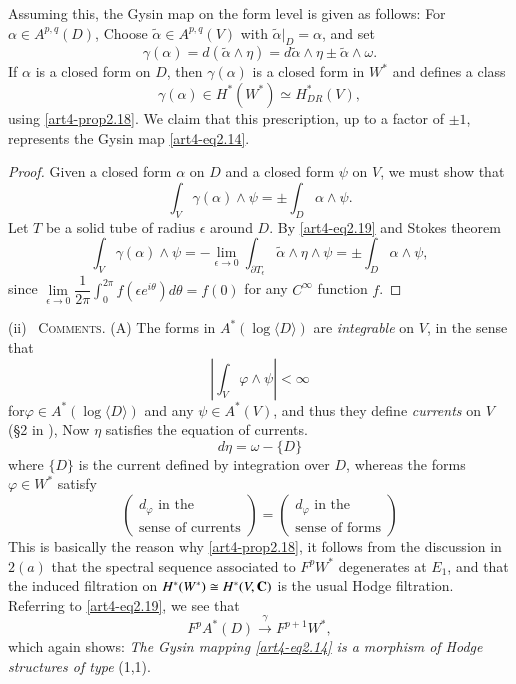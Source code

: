 Assuming this, the Gysin map on the form level is given as follows: For $\alpha \in A^{p,q} (D)$, Choose $\tilde{\alpha} \in A^{p,q} (V)$ with $\tilde{\alpha}|_D = \alpha$, and set
\setcounter{equation}{18}
\begin{equation}
\gamma(\alpha) = d (\tilde{\alpha} \wedge \eta) = d \tilde{\alpha} \wedge \eta \pm \tilde{\alpha} \wedge \omega. \label{art4-eq2.19}
\end{equation}
If $\alpha$ is a closed form on $D$, then $\gamma (\alpha)$ is a closed form in $W^\ast$ and defines a class
$$
\gamma (\alpha) \in H^\ast  (W^\ast) \simeq H^\ast_{DR} (V),
$$
using \eqref{art4-prop2.18}. We claim that this prescription, up to a factor of $\pm 1$, represents the Gysin map \eqref{art4-eq2.14}.

\begin{proof}
Given a closed form $\alpha$ on $D$ and a closed form $\psi$ on $V$, we must show that
$$
\int_V \gamma (\alpha) \wedge \psi = \pm \int_D \alpha \wedge \psi.
$$
Let $T$ be a solid tube of radius $\epsilon$ around $D$. By \eqref{art4-eq2.19} and Stokes theorem
$$
\int_V \gamma (\alpha) \wedge \psi = - \lim\limits_{\epsilon \to 0} \int_{\partial T_\epsilon} \tilde{\alpha} \wedge \eta \wedge \psi = \pm \int_D \alpha \wedge \psi,
$$
since $\lim\limits_{\epsilon \to 0} \dfrac{1}{2 \pi} \int^{2\pi}_0 f (\epsilon e^{i\theta}) d\theta = f (0)$ for any $C^\infty$ function $f$.
\end{proof}

\medskip
\noindent
(ii)~ \textsc{Comments.} (A) The forms in $A^\ast (\log \langle D \rangle)$ are \textit{integrable} on $V$, in the sense that
$$
|\int_V \varphi \wedge \psi| < \infty
$$
for\pageoriginale $\varphi \in A^\ast (\log \langle D \rangle)$ and any $\psi\in A^\ast (V)$, and thus they define \textit{currents} on $V$ (\cf \S 2 in \cite{art4-key18}), Now $\eta$ satisfies the equation of currents.
$$
d \eta = \omega - \{D\}
$$
where $\{D\}$ is the current defined by integration over $D$, whereas the forms $\varphi \in W^\ast$ satisfy
$$
\begin{pmatrix}
d_\varphi \text{ in the }\\
\text{sense of currents}
\end{pmatrix} = 
\begin{pmatrix}
d_\varphi \text{ in the}\\
\text{sense of forms}
\end{pmatrix}
$$
This is basically the reason why \eqref{art4-prop2.18}, it follows from the discussion in $2 (a)$ that the spectral sequence associated to $F^p W^\ast$ degenerates at $E_1$, and that the induced filtration on $H^\ast (W^\ast) \cong H^\ast(V,\mathbf{C})$ is the usual Hodge filtration. Referring to \eqref{art4-eq2.19}, we see that
$$
F^p A^\ast (D) \xrightarrow{\gamma} F^{p+1} W^\ast,
$$
which again shows: \textit{The Gysin mapping \eqref{art4-eq2.14} is a morphism of Hodge structures of type} (1,1).

